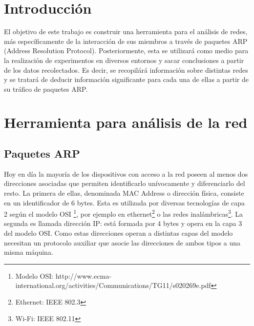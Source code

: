 
\lstset{escapechar=@,style=customc}




\fecha{\today}

\grupo{}


\maketitle

\tableofcontents
\newpage

\section{Introducción}
El objetivo de este trabajo es construir una herramienta para el análisis de redes, más específicamente de la interacción de sus miembros a través de paquetes ARP (Address Resolution Protocol). Posteriormente, esta se utilizará como medio para la realización de experimentos en diversos entornos y sacar conclusiones a partir de los datos recolectados. Es decir, se recopilárá información sobre distintas redes y se tratará de deducir información significante para cada una de ellas a partir de su tráfico de paquetes ARP.

\section{Herramienta para análisis de la red}
\subsection{Paquetes ARP}
Hoy en día la mayoría de los dispositivos con acceso a la red poseen al menos dos direcciones asociadas que permiten identificarlo unívocamente y diferenciarlo del resto. La primera de ellas, denominada MAC Address o dirección física, consiste en un identificador de 6 bytes. Esta es utilizada por diversas tecnologías de capa 2 según el modelo OSI \footnote{Modelo OSI: http://www.ecma-international.org/activities/Communications/TG11/s020269e.pdf}, por ejemplo en ethernet\footnote{Ethernet: IEEE 802.3} o las redes inalámbricas\footnote{Wi-Fi: IEEE 802.11}. La segunda es llamada dirección IP: está formada por 4 bytes y opera en la capa 3 del modelo OSI. Como estas direcciones operan a distintas capas del modelo necesitan un protocolo auxiliar que asocie las direcciones de ambos tipos a una misma máquina.

